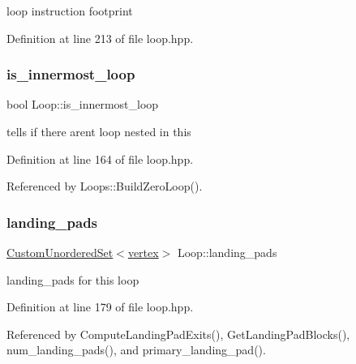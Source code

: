 loop instruction footprint 



Definition at line 213 of file loop.\+hpp.

\mbox{\label{classLoop_a6cebf8444a5558f4d234c44cd38d469c}} 
\subsubsection{\texorpdfstring{is\+\_\+innermost\+\_\+loop}{is\_innermost\_loop}}
{\footnotesize\ttfamily bool Loop\+::is\+\_\+innermost\+\_\+loop\hspace{0.3cm}{\ttfamily [private]}}



tells if there aren\textquotesingle{}t loop nested in this 



Definition at line 164 of file loop.\+hpp.



Referenced by Loops\+::\+Build\+Zero\+Loop().

\mbox{\label{classLoop_a11d02df2d5f7628dff21768eed8a4239}} 
\subsubsection{\texorpdfstring{landing\+\_\+pads}{landing\_pads}}
{\footnotesize\ttfamily \hyperlink{classCustomUnorderedSet}{Custom\+Unordered\+Set}$<$\hyperlink{graph_8hpp_abefdcf0544e601805af44eca032cca14}{vertex}$>$ Loop\+::landing\+\_\+pads\hspace{0.3cm}{\ttfamily [private]}}



landing\+\_\+pads for this loop 



Definition at line 179 of file loop.\+hpp.



Referenced by Compute\+Landing\+Pad\+Exits(), Get\+Landing\+Pad\+Blocks(), num\+\_\+landing\+\_\+pads(), and primary\+\_\+landing\+\_\+pad().

\mbox{\label{classLoop_a875b4998571a8f406f4e15341b9f8039}} 
